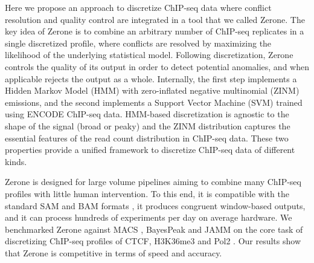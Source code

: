 \documentclass{bioinfo}
\begin{document}
Here we propose an approach to discretize ChIP-seq data where conflict
resolution and quality control are integrated in a tool that we called
Zerone. The key idea of Zerone is to combine an arbitrary number of
ChIP-seq replicates in a single discretized profile, where conflicts are
resolved by maximizing the likelihood of the underlying statistical model.
Following discretization, Zerone controls the quality of its output in
order to detect potential anomalies, and when applicable rejects the
output as a whole. Internally, the first step implements a Hidden Markov
Model (HMM) with zero-inflated negative multinomial (ZINM) emissions, and
the second implements a Support Vector Machine (SVM) trained using ENCODE
ChIP-seq data. HMM-based discretization is agnostic to the shape of the
signal (broad or peaky) and the ZINM distribution captures the essential
features of the read count distribution in ChIP-seq data. These two
properties provide a unified framework to discretize ChIP-seq data of
different kinds.

Zerone is designed for large volume pipelines aiming to combine many
ChIP-seq profiles with little human intervention. To this end, it is
compatible with the standard SAM and BAM formats \citep{pmid19505943},
it produces congruent window-based outputs, and it can process hundreds
of experiments per day on average hardware. We benchmarked Zerone against
MACS \citep{pmid18798982}, BayesPeak \citep{pmid19772557} and
JAMM \citep{pmid25223640} on the core
task of discretizing ChIP-seq profiles of CTCF, H3K36me3 and Pol2 . Our
results show that Zerone is competitive in terms of speed and accuracy.
\end{document}
